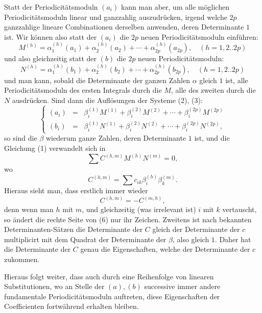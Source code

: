 \documentclass[10pt]{article}
\begin{document}
Statt der Periodicitätsmoduln \((a_i)\) kann man aber, um alle möglichen Periodicitätsmoduln linear und ganzzahlig auszudrücken, irgend welche \(2p\) ganzzahlige lineare Combinationen derselben anwenden, deren Determinante \(1\) ist. Wir können also statt der \((a_i)\) die \(2p\) neuen Periodicitätsmoduln einführen:
\[
\tag{2}M^{(h)}=\alpha_1^{(h)}(a_1)+\alpha_2^{(h)}(a_2)+\cdots+\alpha_{2p}^{(h)}(a_{2p}),\quad(h=1,2..2p)
\]
und also gleichzeitig statt der \((b)\) die \(2p\) neuen Periodicitätsmoduln:
\[
\tag{3}N^{(h)}=\alpha_1^{(h)}(b_1)+\alpha_2^{(h)}(b_2)+\cdots+\alpha_{2p}^{(h)}(b_{2p}),\quad(h=1,2..2p)
\]
und man kann, sobald die Determinante der ganzen Zahlen \(\alpha\) gleich \(1\) ist, alle Periodicitätsmoduln des ersten Integrals durch die \(M\), alle des zweiten durch die \(N\) ausdrücken. Sind dann die Auflösungen der Systeme (2), (3):
\[
\tag{4}
\left\{\begin{array}{rcl}
(a_i)&=&\beta_i^{(1)}M^{(1)}+\beta_i^{(2)}M^{(2)}+\cdots+\beta_i^{(2p)}M^{(2p)}\\
(b_i)&=&\beta_i^{(1)}N^{(1)}+\beta_i^{(2)}N^{(2)}+\cdots+\beta_i^{(2p)}N^{(2p)},
\end{array}\right.
\]
so sind die \(\beta\) wiederum ganze Zahlen, deren Determinante \(1\) ist, und die Gleichung (1) verwandelt sich in
\[
\tag{5}\sum C^{(h,m)}M^{(h)}N^{(m)}=0,
\]
wo
\[
\tag{6}C^{(h,m)}=\sum c_{ik}\beta_i^{(h)}\beta_k^{(m)}.
\]
Hieraus sieht man, dass erstlich immer wieder
\[
C^{(h,m)}=-C^{(m,h)},
\]
denn wenn man \(h\) mit \(m\), und gleichzeitig (was irrelevant ist) \(i\) mit \(k\) vertauscht, so ändert die rechte Seite von (6) nur ihr Zeichen. Zweitens ist nach bekannten Determinanten-Sätzen die Determinante der \(C\) gleich der Determinante der \(c\) multiplicirt mit dem Quadrat der Determinante der \(\beta\), also gleich \(1\). Daher hat die Determinante der \(C\) genau die Eigenschaften, welche der Determinante der \(c\) zukommen.

Hieraus folgt weiter, dass auch durch eine Reihenfolge von linearen Substitutionen, wo an Stelle der \((a),(b)\) successive immer andere fundamentale Periodicitätsmoduln auftreten, diese Eigenschaften der Coefficienten fortwährend erhalten bleiben.
\end{document}
